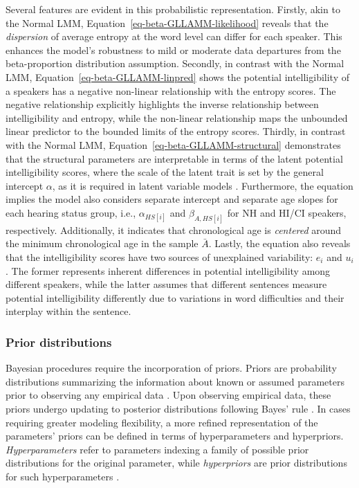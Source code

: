 \documentclass[
  authoryear,
  preprint,
  1p]{elsarticle}
\begin{document}
Several features are evident in this probabilistic representation.
Firstly, akin to the Normal LMM,
Equation~\ref{eq-beta-GLLAMM-likelihood} reveals that the
\emph{dispersion} of average entropy at the word level can differ for
each speaker. This enhances the model's robustness to mild or moderate
data departures from the beta-proportion distribution assumption.
{Secondly, in contrast with the Normal LMM,
Equation~\ref{eq-beta-GLLAMM-linpred} shows the potential
intelligibility of a speakers has a negative non-linear relationship
with the entropy scores. The negative relationship explicitly highlights
the inverse relationship between intelligibility and entropy, while the
non-linear relationship maps the unbounded linear predictor to the
bounded limits of the entropy scores. Thirdly, in contrast with the
Normal LMM, Equation~\ref{eq-beta-GLLAMM-structural} demonstrates that
the structural parameters are interpretable in terms of the latent
potential intelligibility scores, where the scale of the latent trait is
set by the general intercept \(\alpha\), as it is required in latent
variable models \citep{Depaoli_2021}. Furthermore, the equation implies
the model also considers separate intercept and separate age slopes for
each hearing status group, i.e., \(\alpha_{HS[i]}\) and
\(\beta_{A, HS[i]}\) for NH and HI/CI speakers, respectively.
Additionally, it indicates that chronological age is \emph{centered}
around the minimum chronological age in the sample \(\bar{A}\). Lastly,
the equation also reveals that the intelligibility scores have two
sources of unexplained variability: \(e_{i}\) and \(u_{i}\).} The former
represents inherent differences in potential intelligibility among
different speakers, while the latter assumes that different sentences
measure potential intelligibility differently due to variations in word
difficulties and their interplay within the sentence.

\subsubsection{Prior distributions}\label{sec-M-SM-P}

Bayesian procedures require the incorporation of priors. Priors are
probability distributions summarizing the information about known or
assumed parameters prior to observing any empirical data
\citep{Everitt_et_al_2010}. Upon observing empirical data, these priors
undergo updating to posterior distributions following Bayes' rule
\citep{Jeffreys_1998}. In cases requiring greater modeling flexibility,
a more refined representation of the parameters' priors can be defined
in terms of hyperparameters and hyperpriors. \emph{Hyperparameters}
refer to parameters indexing a family of possible prior distributions
for the original parameter, while \emph{hyperpriors} are prior
distributions for such hyperparameters \citep{Everitt_et_al_2010}.
\end{document}
